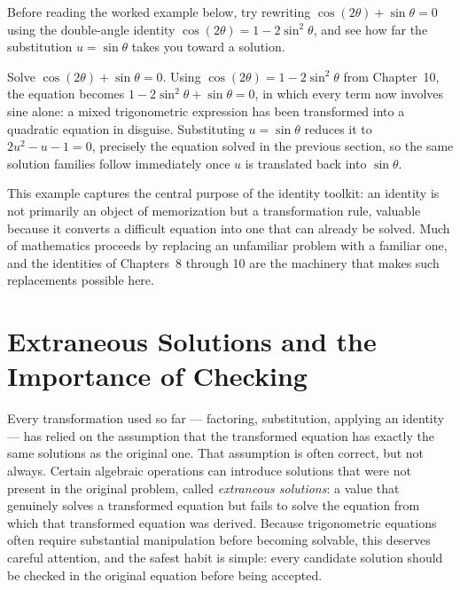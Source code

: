 \begin{practicenow}
Before reading the worked example below, try rewriting $\cos(2\theta) +
\sin\theta = 0$ using the double-angle identity $\cos(2\theta) = 1 -
2\sin^2\theta$, and see how far the substitution $u = \sin\theta$ takes
you toward a solution.
\end{practicenow}

\begin{example}
Solve $\cos(2\theta) + \sin\theta = 0$. Using
$\cos(2\theta) = 1 - 2\sin^2\theta$ from Chapter~10, the equation becomes
$1 - 2\sin^2\theta + \sin\theta = 0$, in which every term now involves
sine alone: a mixed trigonometric expression has been transformed into a
quadratic equation in disguise. Substituting $u = \sin\theta$ reduces it
to $2u^2 - u - 1 = 0$, precisely the equation solved in the previous
section, so the same solution families follow immediately once $u$ is
translated back into $\sin\theta$.
\end{example}

This example captures the central purpose of the identity toolkit: an
identity is not primarily an object of memorization but a transformation
rule, valuable because it converts a difficult equation into one that can
already be solved. Much of mathematics proceeds by replacing an unfamiliar
problem with a familiar one, and the identities of Chapters~8 through 10
are the machinery that makes such replacements possible here.

\section{Extraneous Solutions and the Importance of Checking}

Every transformation used so far --- factoring, substitution, applying an
identity --- has relied on the assumption that the transformed equation has
exactly the same solutions as the original one. That assumption is often
correct, but not always. Certain algebraic operations can introduce
solutions that were not present in the original problem, called
\emph{extraneous solutions}: a value that genuinely solves a transformed
equation but fails to solve the equation from which that transformed
equation was derived. Because trigonometric equations often require
substantial manipulation before becoming solvable, this deserves careful
attention, and the safest habit is simple: every candidate solution should
be checked in the original equation before being accepted.

